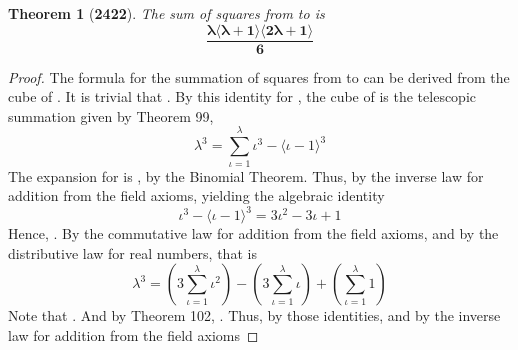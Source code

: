 \documentclass[preview]{standalone}
\newtheorem{theorem}{Theorem}
\begin{document}
\begin{theorem}[\textbf{2422}]
    The sum of squares from  to \bm{$\lambda$} is 
    \begin{equation*}
        \bm{
            \frac{ 
                \lambda 
                \langle \lambda + 1 \rangle 
                \langle 2 \lambda + 1 \rangle 
            }
            {6}
        }
    \end{equation*}
\end{theorem}

\begin{proof}
    The formula for the summation of squares 
    from  to \bm{$\lambda$} 
    can be derived from the cube of \bm{$\lambda$}.
    It is trivial that 
    . 
    By this identity for \bm{$\lambda$},
    the cube of \bm{$\lambda$} is the telescopic summation given by Theorem 99, 
    \begin{equation*}
        \lambda ^3 
            = 
        \sum_{\iota=1}^\lambda \iota ^3 - \big \langle \iota - 1 \big \rangle ^3    
    \end{equation*}
    The expansion for 
    is 
    , 
    by the Binomial Theorem. 
    Thus, 
    by the inverse law for addition from the field axioms,
    yielding the algebraic identity
    \begin{equation*}
        \iota ^3 - \big \langle \iota - 1 \big \rangle ^3 
            = 
        3 \iota ^2 - 3 \iota + 1
    \end{equation*}
    Hence, 
    .
    By the commutative law for addition from the field axioms, 
    and by the distributive law for real numbers,
    that is
    \begin{equation*}
        \lambda ^3 
            = 
        \left( 3 \sum_{\iota=1}^\lambda \iota ^2 \right) 
            - 
        \left( 3 \sum_{\iota=1}^\lambda \iota \right) 
            + 
        \left( \sum_{\iota=1}^\lambda 1 \right)
    \end{equation*}
    Note that . 
    And by Theorem 102, 
    . 
    Thus, 
    by those identities, 
    and by the inverse law for addition from the field axioms

\end{proof}
\end{document}

